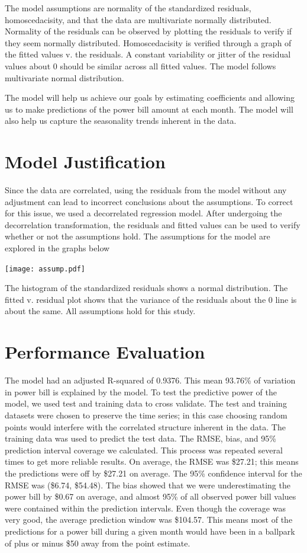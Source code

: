 \documentclass{svproc}
\begin{document}
The model assumptions are normality of the standardized residuals, homoscedacisity, and that the data are multivariate normally distributed. Normality of the residuals can be observed by plotting the residuals to verify if they seem normally distributed. Homoscedacisity is verified through a graph of the fitted values v. the residuals. A constant variability or jitter of the residual values about 0 should be similar across all fitted values. The model follows multivariate normal distribution. 

The model will help us achieve our goals by estimating coefficients and allowing us to make predictions of the power bill amount at each month. The model will also help us capture the seasonality trends inherent in the data.




\section{Model Justification}
Since the data are correlated, using the residuals from the model without any adjustment can lead to incorrect conclusions about the assumptions. To correct for this issue, we used a decorrelated regression model. After undergoing the decorrelation transformation, the residuals and fitted values can be used to verify whether or not the assumptions hold. The assumptions for the model are explored in the graphs below

\begin{center}
\texttt{[image: assump.pdf]}
\end{center}

The histogram of the standardized residuals shows a normal distribution. The fitted v. residual plot shows that the variance of the residuals about the 0 line is about the same. All assumptions hold for this study.

\section{Performance Evaluation}

The model had an adjusted R-squared of 0.9376. This mean 93.76\% of variation in power bill is explained by the model. To test the predictive power of the model, we used test and training data to cross validate. The test and training datasets were chosen to preserve the time series; in this case choosing random points would interfere with the correlated structure inherent in the data. The training data was used to predict the test data. The RMSE, bias, and 95\% prediction interval coverage we calculated. This process was repeated several times to get more reliable results. On average, the RMSE was \$27.21; this means the predictions were off by \$27.21 on average. The 95\% confidence interval for the RMSE was (\$6.74, \$54.48). The bias showed that we were underestimating the power bill by \$0.67 on average, and almost 95\% of all observed power bill values were contained within the prediction intervals. Even though the coverage was very good, the average prediction window was \$104.57. This means most of the predictions for a power bill during a given month would have been in a ballpark of plus or minus \$50 away from the point estimate. 
\end{document}
